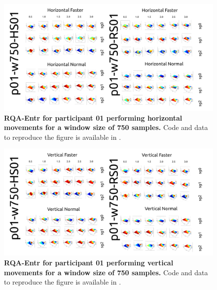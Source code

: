 \documentclass[12pt]{article}
\begin{document}


\newpage
\begin{figure}[ht!]
\centering
\includegraphics{sm-fig07}
    	\caption{
	{\bf RQA-Entr for participant 01 performing horizontal movements for a window size of 750 samples.}
	Code and data to reproduce the figure is available in \cite{srep2021}.
        }
    \label{fig-p01-H-w750}
\end{figure}
\begin{figure}[hb!]
\centering
\includegraphics{sm-fig08}
    	\caption{
	{\bf RQA-Entr for participant 01 performing vertical movements for a window size of 750 samples.}
	Code and data to reproduce the figure is available in \cite{srep2021}.
        }
    \label{fig-p01-V-w750}
\end{figure}
\end{document}
